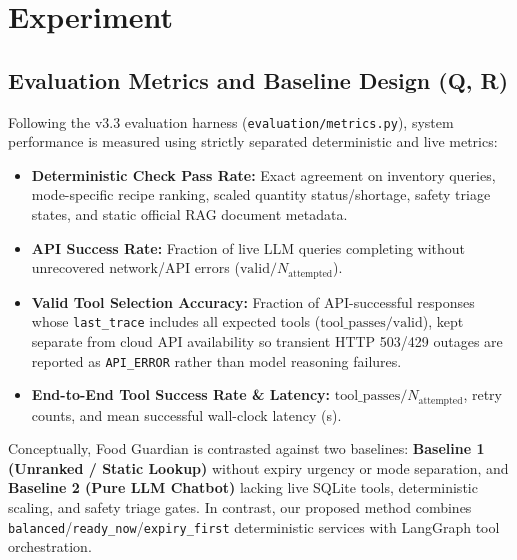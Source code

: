\documentclass[conference]{IEEEtran}
\begin{document}
\section{Experiment}

\subsection{Evaluation Metrics and Baseline Design (Q, R)}
Following the v3.3 evaluation harness (\texttt{evaluation/metrics.py}), system performance is measured using strictly separated deterministic and live metrics:
\begin{itemize}
    \item \textbf{Deterministic Check Pass Rate:} Exact agreement on inventory queries, mode-specific recipe ranking, scaled quantity status/shortage, safety triage states, and static official RAG document metadata.
    \item \textbf{API Success Rate:} Fraction of live LLM queries completing without unrecovered network/API errors ($\text{valid} / N_{\text{attempted}}$).
    \item \textbf{Valid Tool Selection Accuracy:} Fraction of API-successful responses whose \texttt{last\_trace} includes all expected tools ($\text{tool\_passes} / \text{valid}$), kept separate from cloud API availability so transient HTTP 503/429 outages are reported as \texttt{API\_ERROR} rather than model reasoning failures.
    \item \textbf{End-to-End Tool Success Rate \& Latency:} $\text{tool\_passes} / N_{\text{attempted}}$, retry counts, and mean successful wall-clock latency (s).
\end{itemize}

Conceptually, Food Guardian is contrasted against two baselines: \textbf{Baseline 1 (Unranked / Static Lookup)} without expiry urgency or mode separation, and \textbf{Baseline 2 (Pure LLM Chatbot)} lacking live SQLite tools, deterministic scaling, and safety triage gates. In contrast, our proposed method combines \texttt{balanced}/\texttt{ready\_now}/\texttt{expiry\_first} deterministic services with LangGraph tool orchestration.

\end{document}
